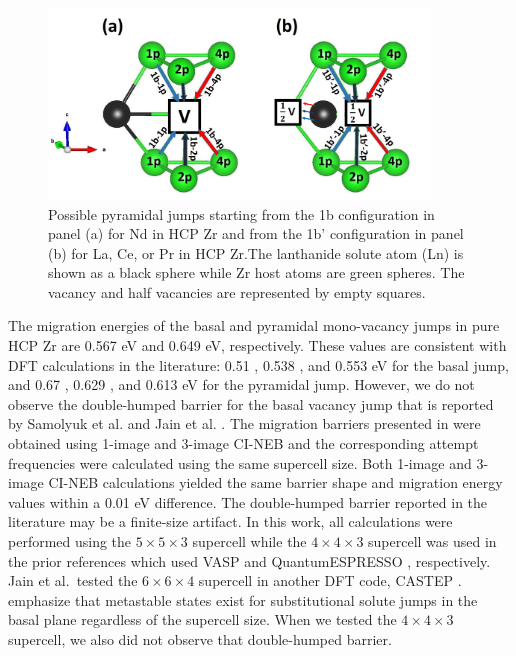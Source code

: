 \documentclass[preprint,12pt]{elsarticle}
\providecommand{\DIFadd}[1]{{\bf #1}} %
\providecommand{\DIFdel}[1]{} %
\providecommand{\DIFaddbegin}{\protect\color{blue}} %
\providecommand{\DIFaddend}{\protect\color{black}} %
\providecommand{\DIFdelbegin}{\protect\color{red}} %
\providecommand{\DIFdelend}{\protect\color{black}} %
\providecommand{\DIFaddbeginFL}{} %
\providecommand{\DIFaddendFL}{} %
\providecommand{\DIFdelbeginFL}{} %
\providecommand{\DIFdelendFL}{} %
\newcommand{\DIFscaledelfig}{0.5}
\newlength{\DIFdelgraphicswidth} %
\newlength{\DIFdelgraphicsheight} %
\newcommand{\DIFaddincludegraphics}[2][]{{\color{blue}\fbox{\DIFOincludegraphics[#1]{#2}}}} %
\newcommand{\DIFdelincludegraphics}[2][]{%
\sbox{\DIFdelgraphicsbox}{\DIFOincludegraphics[#1]{#2}}%
\settoboxwidth{\DIFdelgraphicswidth}{\DIFdelgraphicsbox} %
\settoboxtotalheight{\DIFdelgraphicsheight}{\DIFdelgraphicsbox} %
\scalebox{\DIFscaledelfig}{%
\parbox[b]{\DIFdelgraphicswidth}{\usebox{\DIFdelgraphicsbox}\\[-\baselineskip] \rule{\DIFdelgraphicswidth}{0em}}\llap{\resizebox{\DIFdelgraphicswidth}{\DIFdelgraphicsheight}{%
\setlength{\unitlength}{\DIFdelgraphicswidth}%
\begin{picture}(1,1)%
\thicklines\linethickness{2pt} %
{\color[rgb]{1,0,0}\put(0,0){\framebox(1,1){}}}%
{\color[rgb]{1,0,0}\put(0,0){\line( 1,1){1}}}%
{\color[rgb]{1,0,0}\put(0,1){\line(1,-1){1}}}%
\end{picture}%
}\hspace*{3pt}}} %
} %
\DeclareRobustCommand{\DIFaddbegin}{\DIFOaddbegin \let\includegraphics\DIFaddincludegraphics} %
\DeclareRobustCommand{\DIFaddend}{\DIFOaddend \let\includegraphics\DIFOincludegraphics} %
\DeclareRobustCommand{\DIFdelbegin}{\DIFOdelbegin \let\includegraphics\DIFdelincludegraphics} %
\DeclareRobustCommand{\DIFdelend}{\DIFOaddend \let\includegraphics\DIFOincludegraphics} %
\DeclareRobustCommand{\DIFaddbeginFL}{\DIFOaddbeginFL \let\includegraphics\DIFaddincludegraphics} %
\DeclareRobustCommand{\DIFaddendFL}{\DIFOaddendFL \let\includegraphics\DIFOincludegraphics} %
\DeclareRobustCommand{\DIFdelbeginFL}{\DIFOdelbeginFL \let\includegraphics\DIFdelincludegraphics} %
\DeclareRobustCommand{\DIFdelendFL}{\DIFOaddendFL \let\includegraphics\DIFOincludegraphics} %
\begin{document}
\begin{figure}[h!]
    \centering
    \DIFdelbeginFL %
\DIFdelendFL \DIFaddbeginFL \includegraphics[width=0.9\textwidth]{3_pyramidal_jumps_1b_1bb.jpg}
    \DIFaddendFL \caption{Possible pyramidal jumps starting from the 1b configuration in panel (a) for Nd in HCP Zr and from the 1b' configuration in panel (b) for La, Ce, or Pr in HCP Zr.The lanthanide solute atom (Ln) is shown as a black sphere while Zr host atoms are green spheres. The vacancy and half vacancies are represented by empty squares.}
    \label{fig:pyr_jumps_1b_and_1bb}
\end{figure}

The migration energies of the basal and pyramidal mono-vacancy jumps in pure HCP Zr are 0.567 eV and 0.649 eV, respectively. These values are consistent with DFT calculations in the literature: 0.51 \cite{verite_anisotropy_2007}, 0.538 \cite{samolyuk_analysis_2014}, and 0.553 \cite{jain_first-principles_2019} eV for the basal jump, and  0.67 \cite{verite_anisotropy_2007}, 0.629 \cite{samolyuk_analysis_2014}, and 0.613 \cite{jain_first-principles_2019} eV for the pyramidal jump. However, we do not observe the double-humped barrier for the basal vacancy jump that is reported by Samolyuk et al. \cite{samolyuk_analysis_2014} and Jain et al. \cite{jain_first-principles_2019}. The migration barriers presented in  were obtained using 1-image and 3-image CI-NEB and the corresponding attempt frequencies were calculated using the same supercell size. Both 1-image and 3-image CI-NEB calculations yielded the same barrier shape and migration energy values within a 0.01 eV difference. The double-humped barrier reported in the literature may be a finite-size artifact. In this work, all calculations were performed using the $5\times5\times3$ supercell while the $4\times4\times3$ supercell was used in the prior references \cite{samolyuk_analysis_2014, jain_first-principles_2019} which used VASP \cite{kresse_ab_1993} and QuantumESPRESSO \cite{giannozzi_quantum_2009}, respectively. Jain et al.~tested the $6\times6\times4$ supercell \cite{jain_first-principles_2019} in another DFT code, CASTEP \cite{clark_first_2005}. \DIFdelbegin \DIFdel{They }\DIFdelend \DIFaddbegin \DIFadd{Jain et al. \cite{jain_first-principles_2019} }\DIFaddend emphasize that metastable states exist for substitutional solute jumps in the basal plane regardless of the supercell size. When we tested the $4\times4\times3$ supercell, we also did not observe that double-humped barrier.
\end{document}
